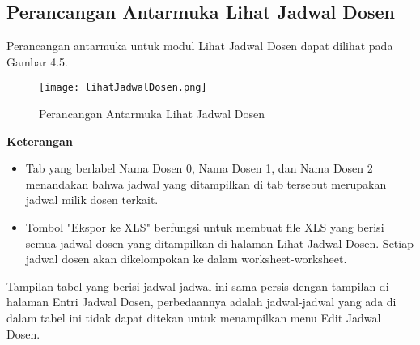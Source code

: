\subsection{Perancangan Antarmuka Lihat Jadwal Dosen}
Perancangan antarmuka untuk modul Lihat Jadwal Dosen dapat dilihat pada Gambar 4.5.
\begin{figure} [H]
	\centering  
	\texttt{[image: lihatJadwalDosen.png]}
	\caption[Perancangan Antarmuka Lihat Jadwal Dosen]{Perancangan Antarmuka Lihat Jadwal Dosen} 
	\label{fig:flow-chart-CodeIgniter} 
\end{figure}
\textbf{Keterangan}
\begin{itemize}
	\item Tab yang berlabel Nama Dosen 0, Nama Dosen 1, dan Nama Dosen 2 menandakan bahwa jadwal yang ditampilkan di tab tersebut merupakan jadwal milik dosen terkait.
	\item Tombol "Ekspor ke XLS" berfungsi untuk membuat file XLS yang berisi semua jadwal dosen yang ditampilkan di halaman Lihat Jadwal Dosen. Setiap jadwal dosen akan dikelompokan ke dalam worksheet-worksheet.
\end{itemize}
Tampilan tabel yang berisi jadwal-jadwal ini sama persis dengan tampilan di halaman Entri Jadwal Dosen, perbedaannya adalah jadwal-jadwal yang ada di dalam tabel ini tidak dapat ditekan untuk menampilkan menu Edit Jadwal Dosen.